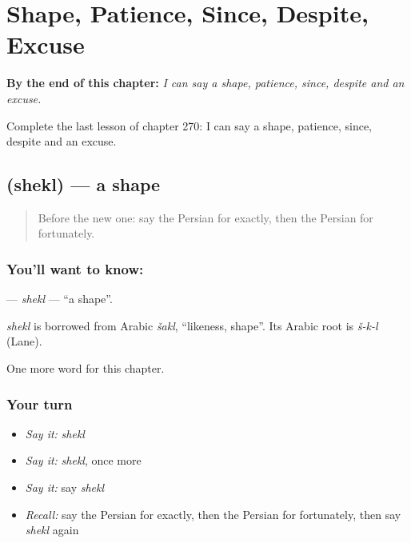 
\chapter{Shape, Patience, Since, Despite, Excuse}
\label{ch:fa-shape-patience-since-despite-excuse}

\begin{chapteropening}
\textbf{By the end of this chapter:} \emph{I can say a shape, patience, since, despite and an excuse.}

Complete the last lesson of chapter 270: I can say a shape, patience, since, despite and an excuse.
\end{chapteropening}

\section[\texorpdfstring{\fa{شکل} (shekl)}{شکل (shekl)}]{ (shekl) — a shape}

\label{lesson:FA-C270-shekl}



\begin{quote}
Before the new one: say the Persian for exactly, then the Persian for fortunately.
\end{quote}

\subsection*{You'll want to know: }
\textbf{} — \emph{shekl} — \textquotedblleft{}a shape\textquotedblright{}.

\begin{cousinweb}
\emph{shekl} is borrowed from Arabic \emph{šakl}, \textquotedblleft{}likeness, shape\textquotedblright{}. Its Arabic root is \emph{š-k-l} (Lane).
\end{cousinweb}

\begin{grammarlens}[title={What you've built}]
One more word for this chapter.
\end{grammarlens}

\subsection*{Your turn}
\begin{itemize}
\raggedright
  \item \emph{Say it:} \emph{shekl}
  \item \emph{Say it:} \emph{shekl}, once more
  \item \emph{Say it:} say \emph{shekl}
  \item \emph{Recall:} say the Persian for exactly, then the Persian for fortunately, then say \emph{shekl} again
\end{itemize}

